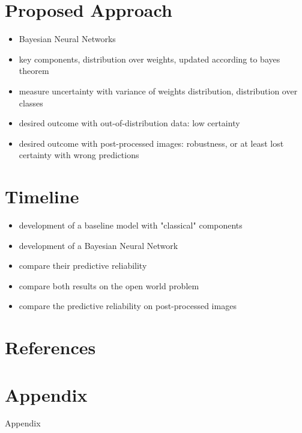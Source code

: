 \documentclass[fleqn,compress,utf8,aspectratio=169,t,handout]{beamer}
\begin{document}
\section{Proposed Approach}
\begin{frame}
\begin{itemize}
    \item Bayesian Neural Networks
    \item key components, distribution over weights, updated according to bayes theorem
    \item measure uncertainty with variance of weights distribution, distribution over classes
    \item desired outcome with out-of-distribution data: low certainty
    \item desired outcome with post-processed images: robustness, or at least lost certainty with wrong predictions
\end{itemize}
\end{frame}

\section{Timeline}
\begin{frame}
\begin{itemize}
    \item development of a baseline model with "classical" components
    \item development of a Bayesian Neural Network
    \item compare their predictive reliability
    \item compare both results on the open world problem
    \item compare the predictive reliability on post-processed images
    
\end{itemize}
\end{frame}





\section{References}

\begin{frame}[allowframebreaks]
\printbibliography
\end{frame}

\appendix

\section{Appendix}
\begin{frame}[noframenumbering]
Appendix
\end{frame}
\end{document}
